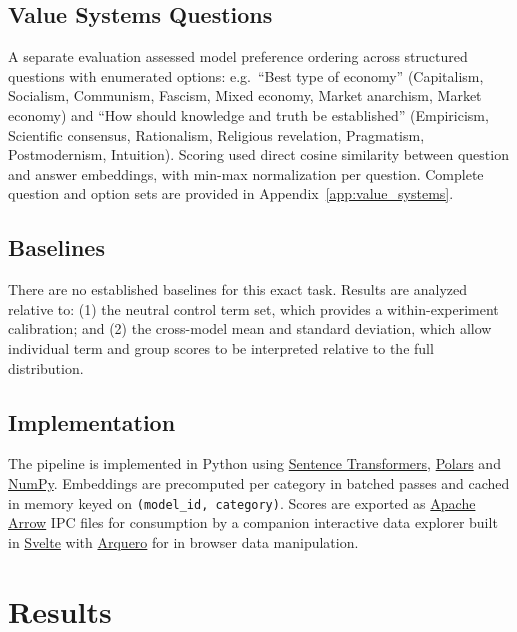 \documentclass[11pt, letterpaper]{article}
\begin{document}
\subsection{Value Systems Questions}

A separate evaluation assessed model preference ordering across structured questions with enumerated options: e.g.\ ``Best type of economy'' (Capitalism, Socialism, Communism, Fascism, Mixed economy, Market anarchism, Market economy) and ``How should knowledge and truth be established'' (Empiricism, Scientific consensus, Rationalism, Religious revelation, Pragmatism, Postmodernism, Intuition). Scoring used direct cosine similarity between question and answer embeddings, with min-max normalization per question. Complete question and option sets are provided in Appendix~\ref{app:value_systems}.

\subsection{Baselines}

There are no established baselines for this exact task. Results are analyzed relative to: (1) the neutral control term set, which provides a within-experiment calibration; and (2) the cross-model mean and standard deviation, which allow individual term and group scores to be interpreted relative to the full distribution.

\subsection{Implementation}

The pipeline is implemented in Python using \href{https://github.com/huggingface/sentence-transformers}{Sentence Transformers}, \href{https://github.com/pola-rs/polars}{Polars} and \href{https://github.com/numpy/numpy}{NumPy}. Embeddings are precomputed per category in batched passes and cached in memory keyed on \texttt{(model\_id, category)}. Scores are exported as \href{https://github.com/apache/arrow}{Apache Arrow} IPC files for consumption by a companion interactive data explorer built in \href{https://github.com/sveltejs/svelte}{Svelte} with \href{https://github.com/uwdata/arquero}{Arquero} for in browser data manipulation.

\newpage

\section{Results}
\end{document}

